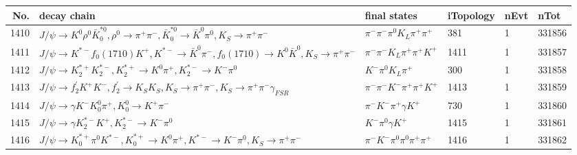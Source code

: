 \begin{table}[htbp] 
\begin{center}
\begin{small}
\begin{tabular}{rlllll}\hline\hline
 No. & decay chain & final states &  iTopology & nEvt & nTot \\\hline
1410&$J/\psi       \rightarrow K^{0}          \rho^{0}      \bar{K}_0^{*0}, \rho^{0}       \rightarrow \pi^{+}        \pi^{-}        , \bar{K}_0^{*0} \rightarrow \bar{K}^{0}   \pi^{0}        , K_{S}           \rightarrow \pi^{+}        \pi^{-}        $&$\pi^{-}        \pi^{-}        \pi^{0}        K_{L}          \pi^{+}        \pi^{+}        $&  381&    1&331856\\
1411&$J/\psi       \rightarrow K^{*-}         f_{0}(1710)    K^{+}          , K^{*-}          \rightarrow \bar{K}^{0}   \pi^{-}        , f_{0}(1710)     \rightarrow K^{0}          \bar{K}^{0}   , K_{S}           \rightarrow \pi^{+}        \pi^{-}        $&$\pi^{-}        \pi^{-}        K_{L}          \pi^{+}        \pi^{+}        K^{+}          $& 1411&    1&331857\\
1412&$J/\psi       \rightarrow K_2^{*+}       K_2^{*-}       , K_2^{*+}        \rightarrow K^{0}          \pi^{+}        , K_2^{*-}        \rightarrow K^{-}          \pi^{0}        $&$K^{-}          \pi^{0}        K_{L}          \pi^{+}        $&  300&    1&331858\\
1413&$J/\psi       \rightarrow f_2^{'}       K^{+}          K^{-}          , f_2^{'}        \rightarrow K_{S}          K_{S}          , K_{S}           \rightarrow \pi^{+}        \pi^{-}        , K_{S}           \rightarrow \pi^{+}        \pi^{-}        \gamma_{FSR} $&$\pi^{-}        \pi^{-}        K^{-}          \pi^{+}        \pi^{+}        K^{+}          $& 1413&    1&331859\\
1414&$J/\psi       \rightarrow \gamma       K^{-}          K_0^{0}        \pi^{+}        , K_0^{0}         \rightarrow K^{+}          \pi^{-}        $&$\pi^{-}        K^{-}          \pi^{+}        \gamma       K^{+}          $&  730&    1&331860\\
1415&$J/\psi       \rightarrow \gamma       K_2^{*-}       K^{+}          , K_2^{*-}        \rightarrow K^{-}          \pi^{0}        $&$K^{-}          \pi^{0}        \gamma       K^{+}          $& 1415&    1&331861\\
1416&$J/\psi       \rightarrow K_{0}^{*+}     \pi^{0}        K^{*-}         , K_{0}^{*+}      \rightarrow K^{0}          \pi^{+}        , K^{*-}          \rightarrow K^{-}          \pi^{0}        , K_{S}           \rightarrow \pi^{+}        \pi^{-}        $&$\pi^{-}        K^{-}          \pi^{0}        \pi^{0}        \pi^{+}        \pi^{+}        $& 1416&    1&331862\\

\end{tabular}
\end{small}
\end{center}
\end{table}
